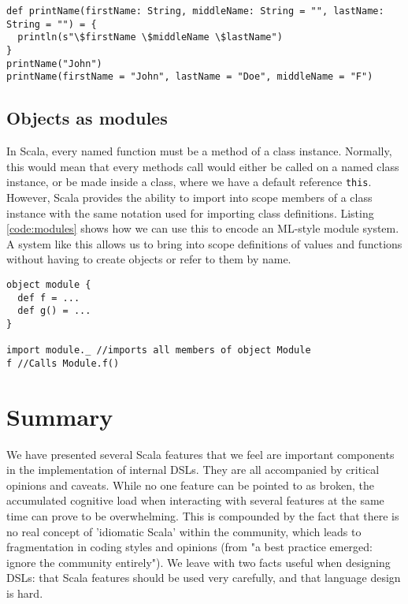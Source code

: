 \begin{lstlisting}[caption=Named parameters \& default arguments, label=code:named]
def printName(firstName: String, middleName: String = "", lastName: String = "") = {
  println(s"\$firstName \$middleName \$lastName")
}
printName("John")
printName(firstName = "John", lastName = "Doe", middleName = "F")
\end{lstlisting}

\subsection{Objects as modules}

In Scala, every named function must be a method of a class instance. Normally, this would mean that every methods call would either be called on a named class instance, or be made inside a class, where we have a default reference \texttt{this}. However, Scala provides the ability to import into scope members of a class instance with the same notation used for importing class definitions. Listing \ref{code:modules} shows how we can use this to encode an ML-style module system. A system like this allows us to bring into scope definitions of values and functions without having to create objects or refer to them by name.

\begin{lstlisting}[caption=Modules, label=code:modules]
object module {
  def f = ...
  def g() = ...
}

import module._ //imports all members of object Module
f //Calls Module.f()
\end{lstlisting}

\section{Summary}

We have presented several Scala features that we feel are important components in the implementation of internal DSLs. They are all accompanied by critical opinions and caveats. While no one feature can be pointed to as broken, the accumulated cognitive load when interacting with several features at the same time can prove to be overwhelming. This is compounded by the fact that there is no real concept of 'idiomatic Scala' within the community, which leads to fragmentation in coding styles and opinions (from \cite{Hale:2011} "a best practice emerged: ignore the community entirely"). We leave with two facts useful when designing DSLs: that Scala features should be used very carefully, and that language design is hard.
